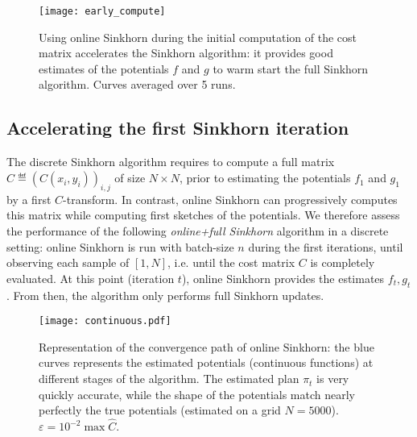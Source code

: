 \begin{figure}[t]
    \centering
    \texttt{[image: early\_compute]}
    
    \vspace{-1em}

    \caption{Using online Sinkhorn during the initial computation of the cost
     matrix accelerates the Sinkhorn algorithm: it provides good estimates of
     the potentials $f$ and $g$ to warm start the full Sinkhorn algorithm.
     Curves averaged over 5 runs. \label{fig:early_compute}}
\end{figure}

\subsection{Accelerating the first Sinkhorn iteration}\label{sec:accelerating}

The discrete Sinkhorn algorithm requires to compute a full matrix $\hat C \eqdef
(C(x_i,y_i))_{i,j}$  of size $N \times N$, prior to estimating the
potentials $f_1$ and $g_1$ by a first $C$-transform. In contrast, online Sinkhorn can progressively
computes this matrix while computing first sketches of the potentials. We therefore
assess the performance of the following \textit{online+full Sinkhorn} algorithm
in a discrete setting: online Sinkhorn is run with batch-size $n$ during the first iterations, until
observing each sample of $[1,N]$, i.e. until the cost matrix $C$ is completely evaluated.
At this point (iteration $t$), online Sinkhorn provides the estimates $f_{t},
g_{t}$. From then, the algorithm only performs full Sinkhorn updates.

\begin{figure*}[t]
    \centering
    \texttt{[image: continuous.pdf]}
    \caption{Representation of the convergence path of online Sinkhorn: the blue curves represents the estimated potentials (continuous functions) at different stages of the algorithm. The estimated plan $\pi_t$ is very quickly accurate, while the shape of the potentials match nearly perfectly the true potentials (estimated on a grid $N = 5000$). $\varepsilon = 10^{-2} \max \hat C$.}

    \label{fig:potentials}
\end{figure*}


